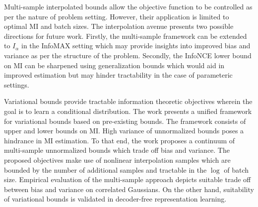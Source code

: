 \documentclass[11pt,letterpaper]{article}
\begin{document}
Multi-sample interpolated bounds allow the objective function to be controlled as per the nature of problem setting. However, their application is limited to optimal MI and batch sizes. The interpolation avenue presents two possible directions for future work. Firstly, the multi-sample framework can be extended to $I_{\alpha}$ in the InfoMAX setting which may provide insights into improved bias and variance as per the structure of the problem. Secondly, the InfoNCE lower bound on MI can be sharpened using generalization bounds which would aid in improved estimation but may hinder tractability in the case of parameteric settings. 

Variational bounds provide tractable information theoretic objectives wherein the goal is to learn a conditional distribution. The work presents a unified framework for variational bounds based on pre-existing bounds. The framework consists of upper and lower bounds on MI. High variance of unnormalized bounds poses a hindrance in MI estimation. To that end, the work proposes a continuum of multi-sample unnormalized bounds which trade off bias and variance. The proposed objectives make use of nonlinear interpolation samples which are bounded by the number of additional samples and tractable in the $\log$ of batch size. Empirical evaluation of the multi-sample approach depicts suitable trade off between bias and variance on correlated Gaussians. On the other hand, suitability of variational bounds is validated in decoder-free representation learning. 
\end{document}
